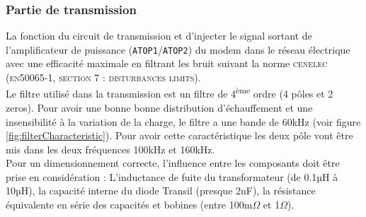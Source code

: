 \documentclass[11pt, a4paper, twoside]{book}
\begin{document}
\subsubsection{Partie de transmission}
La fonction du circuit de transmission et d'injecter le signal sortant de l'amplificateur de puissance (\texttt{ATOP1}/\texttt{ATOP2}) du modem dans le réseau électrique avec une efficacité maximale en filtrant les bruit suivant la norme \textsc{cenelec} ({\textsc{en}50065-1, \textsc{section 7 : disturbances limits}).\\

Le filtre utilisé dans la transmission est un filtre de 4\textsuperscript{ème} ordre (4 pôles et 2 zeros). Pour avoir une bonne bonne distribution d'échauffement et une insensibilité à la variation de la charge, le filtre a une bande de 60kHz (voir figure \ref{fig:filterCharacteristic}). Pour avoir cette caractéristique les deux pôle vont être mis dans les deux fréquences 100kHz et 160kHz.\\

Pour un dimensionnement correcte, l'influence entre les composants doit être prise en considération : L'inductance de fuite du transformateur (de 0.1µH à 10µH), la capacité interne du diode Transil (presque 2nF), la résistance équivalente en série des capacités et bobines (entre 100m$\Omega$ et 1$\Omega$).\\

}
\end{document}
